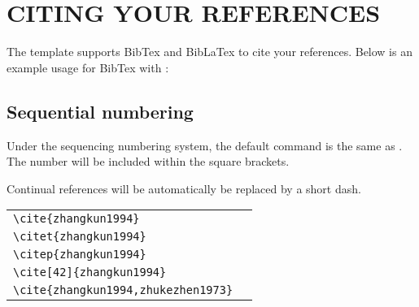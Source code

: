 
\chapter{CITING YOUR REFERENCES}

The template supports BibTex and BibLaTex to cite your references. Below is an example usage for BibTex with :


\section{Sequential numbering}

Under the sequencing numbering system, the default  command is the same as . The number will be included within the square brackets.

Continual references will be automatically be replaced by a short dash.

\begin{tabular}{l@{\quad$\Rightarrow$\quad}l}
  \verb|\cite{zhangkun1994}|               & \cite{zhangkun1994}               \\
  \verb|\citet{zhangkun1994}|              & \citet{zhangkun1994}              \\
  \verb|\citep{zhangkun1994}|              & \citep{zhangkun1994}              \\
  \verb|\cite[42]{zhangkun1994}|           & \cite[42]{zhangkun1994}           \\
  \verb|\cite{zhangkun1994,zhukezhen1973}| & \cite{zhangkun1994,zhukezhen1973} \\
\end{tabular}





